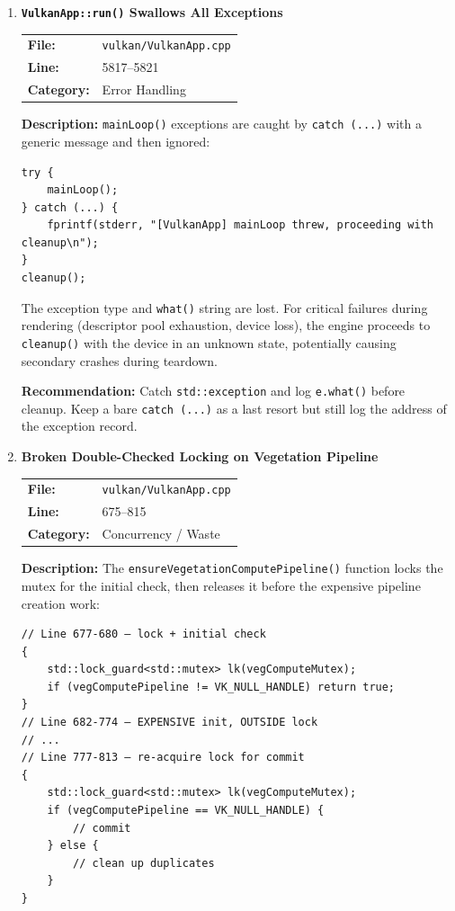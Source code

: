 \documentclass[a4paper,12pt]{article}
\newcommand{\severitybox}[2]{%
  \colorbox{#1}{\makebox[2.5cm][c]{\textcolor{white}{\textbf{#2}}}}%
}
\begin{document}
\begin{enumerate}[leftmargin=*]
\item[\textbf{[G3]}] \textbf{\texttt{VulkanApp::run()} Swallows All Exceptions}
  \hfill \severitybox{mediumcolor}{MEDIUM}

  \begin{tabular}{ll}
    \textbf{File:} & \texttt{vulkan/VulkanApp.cpp} \\
    \textbf{Line:} & 5817--5821 \\
    \textbf{Category:} & Error Handling \\
  \end{tabular}

  \textbf{Description:}
  \texttt{mainLoop()} exceptions are caught by \texttt{catch (...)} with a
  generic message and then ignored:

\begin{lstlisting}
try {
    mainLoop();
} catch (...) {
    fprintf(stderr, "[VulkanApp] mainLoop threw, proceeding with cleanup\n");
}
cleanup();
\end{lstlisting}

  The exception type and \texttt{what()} string are lost. For critical
  failures during rendering (descriptor pool exhaustion, device loss), the
  engine proceeds to \texttt{cleanup()} with the device in an unknown state,
  potentially causing secondary crashes during teardown.

  \textbf{Recommendation:}
  Catch \texttt{std::exception} and log \texttt{e.what()} before cleanup.
  Keep a bare \texttt{catch (...)} as a last resort but still log the
  address of the exception record.

\item[\textbf{[P11]}] \textbf{Broken Double-Checked Locking on Vegetation Pipeline}
  \hfill \severitybox{mediumcolor}{MEDIUM}

  \begin{tabular}{ll}
    \textbf{File:} & \texttt{vulkan/VulkanApp.cpp} \\
    \textbf{Line:} & 675--815 \\
    \textbf{Category:} & Concurrency / Waste \\
  \end{tabular}

  \textbf{Description:}
  The \texttt{ensureVegetationComputePipeline()} function locks the mutex
  for the initial check, then releases it before the expensive pipeline
  creation work:

\begin{lstlisting}
// Line 677-680 — lock + initial check
{
    std::lock_guard<std::mutex> lk(vegComputeMutex);
    if (vegComputePipeline != VK_NULL_HANDLE) return true;
}
// Line 682-774 — EXPENSIVE init, OUTSIDE lock
// ...
// Line 777-813 — re-acquire lock for commit
{
    std::lock_guard<std::mutex> lk(vegComputeMutex);
    if (vegComputePipeline == VK_NULL_HANDLE) {
        // commit
    } else {
        // clean up duplicates
    }
}
\end{lstlisting}


\end{enumerate}
\end{document}
